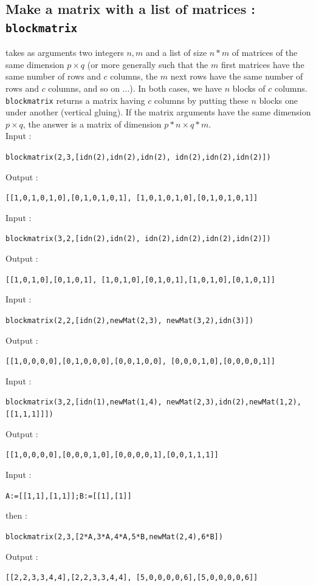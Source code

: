 \documentclass[a4paper,11pt]{book}
\begin{document}
\subsection{Make a matrix with a list of matrices : {\tt blockmatrix}}
 takes as arguments two integers $n,m$ and a 
list of size  $n*m$ of matrices of the same dimension $p \times q$ 
(or more generally such that the $m$ first matrices 
have the same number of rows and $c$ columns, the 
$m$ next rows have the same number of rows and $c$ columns, and so on ...).
In both cases, we have $n$ blocks of $c$ columns.\\
{\tt  blockmatrix} returns a matrix having  $c$ columns 
by putting these $n$ blocks one under another (vertical gluing). 
If the matrix arguments
have the same dimension $p \times q$, the answer is a matrix of
dimension $p*n \times q*m$.\\
Input :
\begin{center}{\tt blockmatrix(2,3,[idn(2),idn(2),idn(2), idn(2),idn(2),idn(2)])}\end{center}
Output :
\begin{center}{\tt [[1,0,1,0,1,0],[0,1,0,1,0,1], [1,0,1,0,1,0],[0,1,0,1,0,1]]}\end{center}
Input :
\begin{center}{\tt blockmatrix(3,2,[idn(2),idn(2), idn(2),idn(2),idn(2),idn(2)])}\end{center}
Output :
\begin{center}{\tt [[1,0,1,0],[0,1,0,1], [1,0,1,0],[0,1,0,1],[1,0,1,0],[0,1,0,1]]}\end{center}
Input :
\begin{center}{\tt blockmatrix(2,2,[idn(2),newMat(2,3), newMat(3,2),idn(3)])}\end{center}
Output :
\begin{center}{\tt [[1,0,0,0,0],[0,1,0,0,0],[0,0,1,0,0], [0,0,0,1,0],[0,0,0,0,1]] }\end{center}
Input :
\begin{center}{\tt blockmatrix(3,2,[idn(1),newMat(1,4), newMat(2,3),idn(2),newMat(1,2),[[1,1,1]]])}\end{center}
Output :
\begin{center}{\tt [[1,0,0,0,0],[0,0,0,1,0],[0,0,0,0,1],[0,0,1,1,1]]}\end{center}
Input :
\begin{center}{\tt A:=[[1,1],[1,1]];B:=[[1],[1]]}\end{center}
then :
\begin{center}{\tt blockmatrix(2,3,[2*A,3*A,4*A,5*B,newMat(2,4),6*B])}\end{center}
Output :
\begin{center}{\tt [[2,2,3,3,4,4],[2,2,3,3,4,4], [5,0,0,0,0,6],[5,0,0,0,0,6]]}\end{center}
\end{document}
